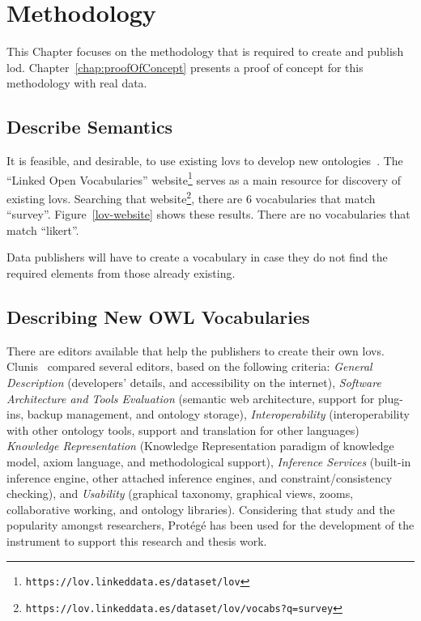 \chapter{Methodology}
\label{chap:methodology}

\begin{doublespace}
 
This Chapter focuses on the methodology that is 
required to create and publish \ac{lod}.
Chapter~\ref{chap:proofOfConcept} 
presents a proof of concept for this methodology with real data.

\section{Describe Semantics}
\label{sec:semantics}
 
It is feasible, and desirable, to use existing \acp{lov} 
to develop new ontologies~\cite{kotis2020ontology}. 
The ``Linked Open Vocabularies'' website\footnote{\tt https://lov.linkeddata.es/dataset/lov} 
serves as a main resource for discovery of existing \acp{lov}. 
Searching that website\footnote{\tt https://lov.linkeddata.es/dataset/lov/vocabs?q=survey}, 
there are 6 vocabularies that match ``survey''.
Figure~\ref{lov-website} shows these results.
There are no vocabularies that match ``likert''. 

Data publishers will have to create a vocabulary 
in case they do not find the required elements 
from those already existing.

\section{Describing New OWL Vocabularies}
\label{sec:describenewowlvocab}

There are editors available that help the publishers to create their own \acp{lov}.
Clunis~\cite{clunis2019comparative} compared several editors, based on the following criteria: 
\emph{General Description} 
(developers' details, and accessibility on the internet), 
\emph{Software Architecture and Tools Evaluation} 
(semantic web architecture, support for plug-ins, backup management, and ontology storage), 
\emph{Interoperability} 
(interoperability with other ontology tools, support and translation for other languages) 
\emph{Knowledge Representation} 
(Knowledge Representation paradigm of knowledge model, axiom language, and methodological support), 
\emph{Inference Services} 
(built-in inference engine, other attached inference engines, and constraint/consistency checking), and
\emph{Usability} 
(graphical taxonomy, graphical views, zooms, collaborative working, and ontology libraries).
Considering that study and the popularity amongst researchers, 
Protégé has been used for the development of the instrument 
to support this research and thesis work.


\end{doublespace}
